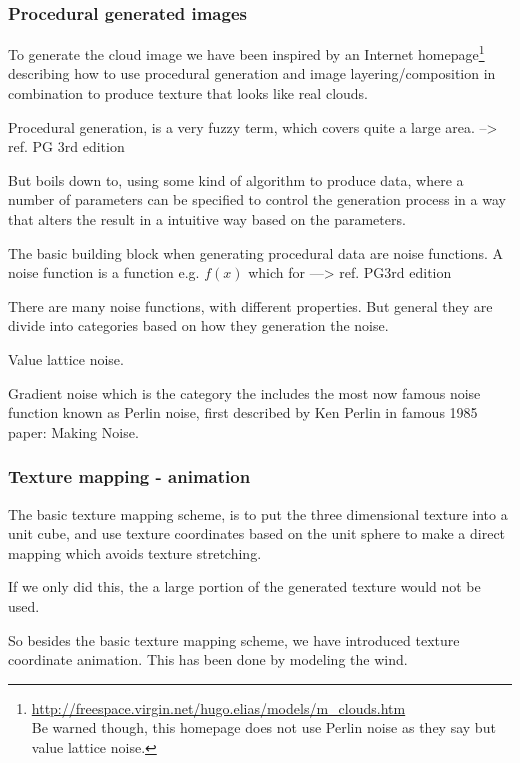 \subsubsection{Procedural generated images}
To generate the cloud image we have been inspired by an Internet
homepage\footnote{\url{http://freespace.virgin.net/hugo.elias/models/m_clouds.htm}
  \\Be warned though, this homepage does not use Perlin noise as they
  say but value lattice noise.}
describing how to use procedural generation and
image layering/composition in combination to produce texture that
looks like real clouds.

Procedural generation, is a very fuzzy term, which covers quite a
large area.
--> ref. PG 3rd edition

But boils down to, using some kind of algorithm to produce data, where
a number of parameters can be specified to control the
generation process in a way that alters the result in a intuitive way
based on the parameters.

The basic building block when generating procedural data are noise
functions. A noise function is a function e.g. $f(x)$ which for 
---> ref. PG3rd edition

There are many noise functions, with different properties. But general
they are divide into categories based on how they generation the
noise.

Value lattice noise.

Gradient noise which is the category the includes the most 
now famous noise function known as Perlin noise, first described by Ken
Perlin in famous 1985 paper: Making Noise. 


\subsubsection{Texture mapping - animation}
The basic texture mapping scheme, is to put the three dimensional
texture into a unit cube, and use texture coordinates based on the
unit sphere to make a direct mapping which avoids texture stretching.

If we only did this, the a large portion of the generated texture
would not be used.

So besides the basic texture mapping scheme, we have introduced
texture coordinate animation. This has been done by modeling the wind.









